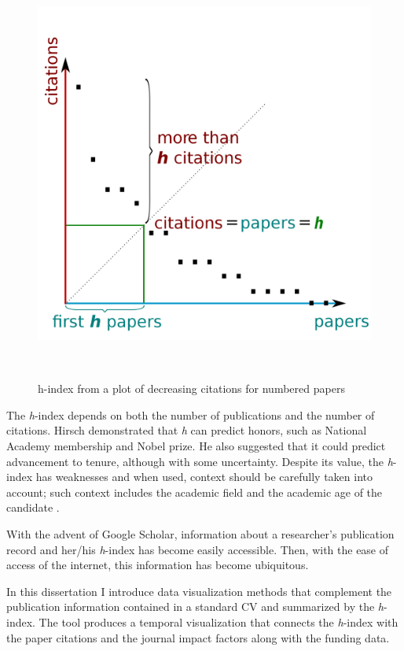\begin{figure}
    \centering
    \includegraphics[width=1\textwidth]{figures/H-index.png}
    \caption{h-index from a plot of decreasing citations for numbered papers}~\label{fig-hindex}
\end{figure}


The {\it h}-index depends on both the number of publications and the number of citations. Hirsch demonstrated that {\it h} can predict honors, such as National Academy membership and Nobel prize. He also suggested that it could predict advancement to tenure, although with some uncertainty.
Despite its value, the {\it h}-index has weaknesses and when used, context should be carefully taken into account; such context includes the academic field and the academic age of the candidate \cite{Bornmann2}.

With the advent of Google Scholar, information about a researcher's publication record and her/his {\it h}-index has become easily accessible. Then, with the ease of access of the internet, this information has become ubiquitous.

In this dissertation I introduce data visualization methods that complement the publication information contained in a standard CV and summarized by the {\it h}-index. The tool produces a temporal visualization that connects the {\it h}-index with the paper citations and the journal impact factors along with the funding data.

